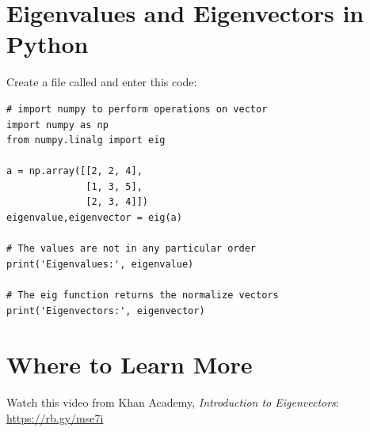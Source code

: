 \section{Eigenvalues and Eigenvectors in Python}
Create a file called  and enter this code:

\begin{Verbatim}
# import numpy to perform operations on vector
import numpy as np
from numpy.linalg import eig

a = np.array([[2, 2, 4], 
              [1, 3, 5],
              [2, 3, 4]])
eigenvalue,eigenvector = eig(a)

# The values are not in any particular order
print('Eigenvalues:', eigenvalue)

# The eig function returns the normalize vectors
print('Eigenvectors:', eigenvector)

\end{Verbatim}

\section{Where to Learn More}
Watch this video from Khan Academy, \emph{Introduction to Eigenvectors}: \url{https://rb.gy/mse7i}
